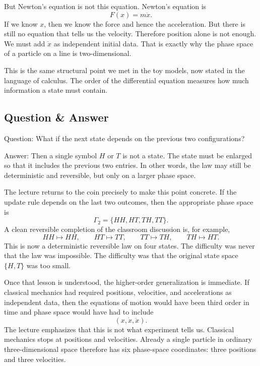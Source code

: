 But Newton's equation is not this equation. Newton's equation is
\begin{equation}
F(x)=m\ddot{x}.
\end{equation}
If we know \(x\), then we know the force and hence the acceleration. But there is still no equation that tells us the velocity. Therefore position alone is not enough. We must add \(\dot{x}\) as independent initial data. That is exactly why the phase space of a particle on a line is two-dimensional.

This is the same structural point we met in the toy models, now stated in the language of calculus. The order of the differential equation measures how much information a state must contain.

\subsection{Question \& Answer}

Question: What if the next state depends on the previous two configurations?

Answer: Then a single symbol \(H\) or \(T\) is not a state. The state must be enlarged so that it includes the previous two entries. In other words, the law may still be deterministic and reversible, but only on a larger phase space.

The lecture returns to the coin precisely to make this point concrete. If the update rule depends on the last two outcomes, then the appropriate phase space is
\begin{equation}
\Gamma_2=\{HH,HT,TH,TT\}.
\end{equation}
A clean reversible completion of the classroom discussion is, for example,
\begin{equation}
HH\mapsto HH,\qquad
HT\mapsto TT,\qquad
TT\mapsto TH,\qquad
TH\mapsto HT.
\end{equation}
This is now a deterministic reversible law on four states. The difficulty was never that the law was impossible. The difficulty was that the original state space \(\{H,T\}\) was too small.

Once that lesson is understood, the higher-order generalization is immediate. If classical mechanics had required positions, velocities, and accelerations as independent data, then the equations of motion would have been third order in time and phase space would have had to include
\[
(x,\dot{x},\ddot{x}).
\]
The lecture emphasizes that this is not what experiment tells us. Classical mechanics stops at positions and velocities. Already a single particle in ordinary three-dimensional space therefore has six phase-space coordinates: three positions and three velocities.

